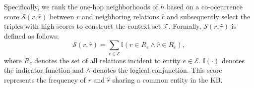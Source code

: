 \documentclass[11pt]{article}
\begin{document}
Specifically, we rank the one-hop neighborhoods of $h$ based on a co-occurrence score $\mathcal{S}(r, \hat{r})$ between $r$ and neighboring relations $\hat{r}$ and subsequently select the triples with high scores to construct the context set $\mathcal{T}$. Formally, $\mathcal{S}(r, \hat{r})$ is defined as follows:
\begin{equation}
    \mathcal{S}(r, \hat{r}) = \sum_{e \in \mathcal{E}} \mathbb{I}(r \in R_e \land \hat{r} \in R_e),
\end{equation}
where $R_e$ denotes the set of all relations incident to entity $e \in \mathcal{E}$. $\mathbb{I}(\cdot)$ denotes the indicator function and $\wedge$ denotes the logical conjunction. This score represents the frequency of $r$ and $\hat{r}$ sharing a common entity in the KB.



\end{document}
